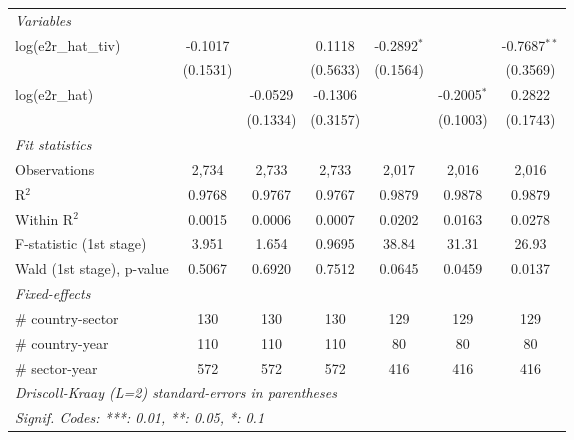 \documentclass[a4paper]{article}
\begin{document}
\begin{table}[h!]
\begin{tabular}{lcccccc}
      \midrule
       \emph{Variables}\\
      log(e2r\_hat\_tiv)        & -0.1017               &                        & 0.1118                & -0.2892$^{*}$         &                        & -0.7687$^{**}$\\   
                                & (0.1531)              &                        & (0.5633)              & (0.1564)              &                        & (0.3569)\\   
      log(e2r\_hat)             &                       & -0.0529                & -0.1306               &                       & -0.2005$^{*}$          & 0.2822\\   
                                &                       & (0.1334)               & (0.3157)              &                       & (0.1003)               & (0.1743)\\ 
      \emph{Fit statistics}\\
      Observations              & 2,734                 & 2,733                  & 2,733                 & 2,017                 & 2,016                  & 2,016\\  
      R$^2$                     & 0.9768                & 0.9767                 & 0.9767                & 0.9879                & 0.9878                 & 0.9879\\  
      Within R$^2$              & 0.0015                & 0.0006                 & 0.0007                & 0.0202                & 0.0163                 & 0.0278\\  
      F-statistic (1st stage)        & 3.951                 & 1.654                  & 0.9695                & 38.84                 & 31.31                  & 26.93\\  
      Wald (1st stage), p-value & 0.5067                & 0.6920                 & 0.7512                & 0.0645                & 0.0459                 & 0.0137\\ 
      \midrule
      \emph{Fixed-effects}\\
      \# country-sector         & 130                   & 130                   & 130                      & 129                   & 129                   & 129\\  
      \# country-year           & 110                   & 110                   & 110                      & 80                    & 80                    & 80\\  
      \# sector-year            & 572                   & 572                   & 572                      & 416                   & 416                   & 416\\  
      \midrule \midrule
      \multicolumn{7}{l}{\emph{Driscoll-Kraay (L=2) standard-errors in parentheses}}\\
      \multicolumn{7}{l}{\emph{Signif. Codes: ***: 0.01, **: 0.05, *: 0.1}}\\
   \end{tabular}
\end{table}
\FloatBarrier
\end{document}
